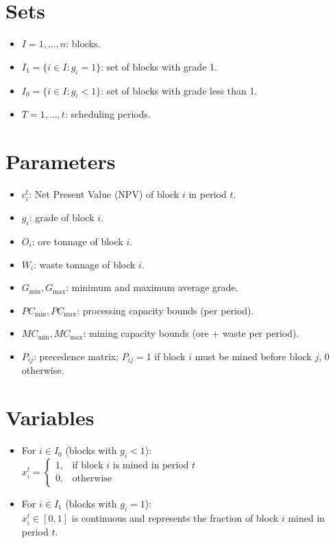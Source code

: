 \documentclass{article}
\begin{document}
\section{Sets}
\begin{itemize}[leftmargin=*,nosep]
    \item $I = 1, \ldots, n$: blocks.
    \item $I_1 = \{i \in I : g_i = 1\}$: set of blocks with grade 1.
    \item $I_0 = \{i \in I : g_i < 1\}$: set of blocks with grade less than 1.
    \item $T = 1, \ldots, t$: scheduling periods.
\end{itemize}

\section{Parameters}
\begin{itemize}[leftmargin=*,nosep]
    \item $c_i^t$: Net Present Value (NPV) of block $i$ in period $t$.
    \item $g_i$: grade of block $i$.
    \item $O_i$: ore tonnage of block $i$.
    \item $W_i$: waste tonnage of block $i$.
    \item $G_{\min}, G_{\max}$: minimum and maximum average grade.
    \item $PC_{\min}, PC_{\max}$: processing capacity bounds (per period).
    \item $MC_{\min}, MC_{\max}$: mining capacity bounds (ore + waste per period).
    \item $P_{ij}$: precedence matrix; $P_{ij} = 1$ if block $i$ must be mined before block $j$, $0$ otherwise.
\end{itemize}

\section{Variables}
\begin{itemize}[leftmargin=*,nosep]
    \item For $i \in I_0$ (blocks with $g_i < 1$):\\
    $x_i^t = \begin{cases} 
        1, & \text{if block } i \text{ is mined in period } t \\
        0, & \text{otherwise}
    \end{cases}$

    \item For $i \in I_1$ (blocks with $g_i = 1$):\\
    $x_i^t \in [0, 1]$ is continuous and represents the fraction of block $i$ mined in period $t$.
\end{itemize}
\end{document}
